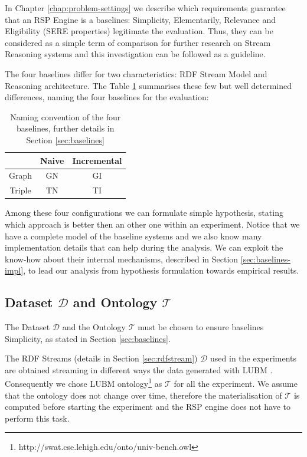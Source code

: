 In Chapter \ref{chap:problem-settings} we describe which requirements guarantee that an RSP Engine is a baselines: Simplicity, Elementarily, Relevance and Eligibility (SERE properties) legitimate the evaluation. Thus, they can be considered as a simple term of comparison for further research on Stream Reasoning systems and this investigation can be followed as a guideline.
 
The four baselines differ for two characteristics: RDF Stream Model and Reasoning architecture. The Table \ref{tab:baselines-names} summarises these few but well determined differences, naming the four baselines for the evaluation:\begin{table}[htb]
\scriptsize
\centering
\begin{tabular}{c|cc} %
	\hline
         & Naive & Incremental\\
	\hline
	Graph        &  GN      & GI\\
	Triple   &  TN   & TI\\
	\hline %
\end{tabular}
\caption{Naming convention of the four baselines, further details in Section \ref{sec:baselines}}
\label{tab:baselines-names}
\end{table}

\noindent Among these four configurations we can formulate simple hypothesis, stating which approach is better then an other one within an experiment. Notice that we have a complete model of the baseline systems and we also know many implementation details that can help during the analysis. We can exploit the know-how about their internal mechanisms, described in Section \ref{sec:baselines-impl}, to lead our analysis from hypothesis formulation towards empirical results. 

\subsection{Dataset $\mathcal{D}$ and Ontology $\mathcal{T}$}\label{sec:dataset}

\noindent The Dataset  $\mathcal{D}$ and the Ontology $\mathcal{T}$ must be chosen to ensure baselines Simplicity, as stated in Section \ref{sec:baselines}. 

The RDF Streams (details in Section \ref{sec:rdfstream}) $\mathcal{D}$ used in the experiments are obtained streaming in different ways the data generated with LUBM  \cite{Guo2005}. Consequently we chose LUBM ontology\footnote{http://swat.cse.lehigh.edu/onto/univ-bench.owl} as $\mathcal{T}$ for all the experiment. We assume that the ontology does not change over time, therefore the materialisation of $\mathcal{T}$ is computed before starting the experiment and the RSP engine does not have to perform this task. 


